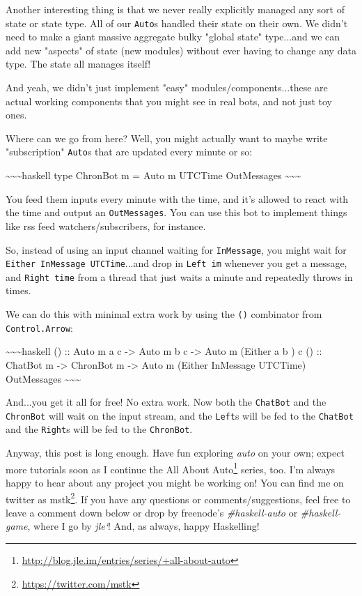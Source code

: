 \documentclass[]{article}
\renewcommand{\href}[2]{#2\footnote{\url{#1}}}
\begin{document}
Another interesting thing is that we never really explicitly managed any sort of
state or state type. All of our \texttt{Auto}s handled their state on their own.
We didn't need to make a giant massive aggregate bulky "global state" type...and
we can add new "aspects" of state (new modules) without ever having to change
any data type. The state all manages itself!

And yeah, we didn't just implement "easy" modules/components...these are actual
working components that you might see in real bots, and not just toy ones.

Where can we go from here? Well, you might actually want to maybe write
"subscription" \texttt{Auto}s that are updated every minute or so:

\textasciitilde{}\textasciitilde{}\textasciitilde{}haskell type ChronBot m =
Auto m UTCTime OutMessages \textasciitilde{}\textasciitilde{}\textasciitilde{}

You feed them inputs every minute with the time, and it's allowed to react with
the time and output an \texttt{OutMessages}. You can use this bot to implement
things like rss feed watchers/subscribers, for instance.

So, instead of using an input channel waiting for \texttt{InMessage}, you might
wait for \texttt{Either\ InMessage\ UTCTime}...and drop in \texttt{Left\ im}
whenever you get a message, and \texttt{Right\ time} from a thread that just
waits a minute and repeatedly throws in times.

We can do this with minimal extra work by using the
\texttt{(\textbar{}\textbar{}\textbar{})} combinator from
\texttt{Control.Arrow}:

\textasciitilde{}\textasciitilde{}\textasciitilde{}haskell
(\textbar{}\textbar{}\textbar{}) :: Auto m a c -\textgreater{} Auto m b c
-\textgreater{} Auto m (Either a b ) c (\textbar{}\textbar{}\textbar{}) ::
ChatBot m -\textgreater{} ChronBot m -\textgreater{} Auto m (Either InMessage
UTCTime) OutMessages \textasciitilde{}\textasciitilde{}\textasciitilde{}

And...you get it all for free! No extra work. Now both the \texttt{ChatBot} and
the \texttt{ChronBot} will wait on the input stream, and the \texttt{Left}s will
be fed to the \texttt{ChatBot} and the \texttt{Right}s will be fed to the
\texttt{ChronBot}.

Anyway, this post is long enough. Have fun exploring \emph{auto} on your own;
expect more tutorials soon as I continue the
\href{http://blog.jle.im/entries/series/+all-about-auto}{All About Auto} series,
too. I'm always happy to hear about any project you might be working on! You can
find me on twitter as \href{https://twitter.com/mstk}{mstk}. If you have any
questions or comments/suggestions, feel free to leave a comment down below or
drop by freenode's \emph{\#haskell-auto} or \emph{\#haskell-game}, where I go by
\emph{jle`}! And, as always, happy Haskelling!
\end{document}
